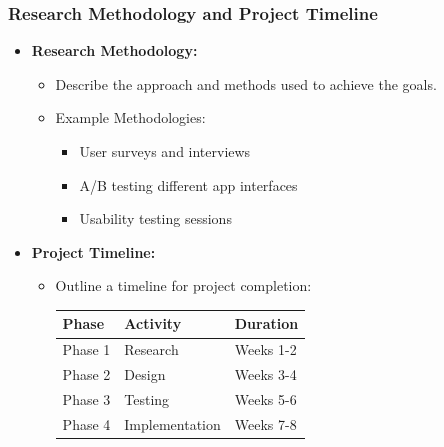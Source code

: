 \documentclass{beamer}
\begin{document}
\begin{frame}[fragile]
    \frametitle{Research Methodology and Project Timeline}
    \begin{itemize}
        \item \textbf{Research Methodology:}
        \begin{itemize}
            \item Describe the approach and methods used to achieve the goals.
            \item Example Methodologies:
            \begin{itemize}
                \item User surveys and interviews
                \item A/B testing different app interfaces
                \item Usability testing sessions
            \end{itemize}
        \end{itemize}

        \item \textbf{Project Timeline:}
        \begin{itemize}
            \item Outline a timeline for project completion:
            \begin{tabular}{|l|l|l|}
                \hline
                \textbf{Phase} & \textbf{Activity} & \textbf{Duration} \\
                \hline
                Phase 1 & Research & Weeks 1-2 \\
                Phase 2 & Design & Weeks 3-4 \\
                Phase 3 & Testing & Weeks 5-6 \\
                Phase 4 & Implementation & Weeks 7-8 \\
                \hline
            \end{tabular}
        \end{itemize}
    \end{itemize}
\end{frame}
\end{document}
